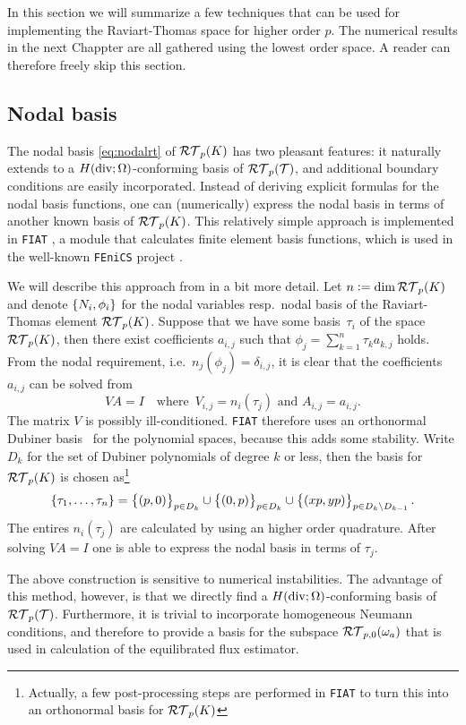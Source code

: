 \documentclass[thesis.tex]{subfiles}
\begin{document}
  In this section we will summarize a few techniques that can be used for implementing the Raviart-Thomas space for higher order $p$.
  The numerical results in the next Chappter are all gathered using the lowest order space. A reader can therefore freely skip this section.

  \subsection{Nodal basis}
  The nodal basis \eqref{eq:nodalrt} of $\mathcal{RT}_p(K)$ has two pleasant features: it
  naturally extends to a $H(\operatorname{div}; \Omega)$-conforming basis of $\mathcal{RT}_p(\mathcal{T})$, and additional boundary conditions are easily incorporated.
  Instead of deriving explicit formulas for the nodal basis functions, one can (numerically) express the nodal basis in terms
  of another known basis of $\mathcal{RT}_p(K)$. This relatively simple approach is implemented in \texttt{FIAT} \cite{kirby}, a module that 
  calculates finite element basis functions,  
  which is used in the well-known \texttt{FEniCS} project \cite{fenics}. 

  We will describe this approach from \cite{kirby} in a bit more detail. Let $n := \dim \mathcal{RT}_p(K)$ and denote $\set{N_i, \phi_i}$ for the nodal variables 
  resp.~nodal basis of the Raviart-Thomas element $\mathcal{RT}_p(K)$.
  Suppose that we have some basis~$\tau_i$ of the space~$\mathcal{RT}_p(K)$, then there exist coefficients $a_{i,j}$ such that
  $\phi_j = \sum_{k = 1}^n \tau_k a_{k,j}$ holds.
  From the nodal requirement, i.e.~$n_j(\phi_j) = \delta_{i,j}$, it is clear that the coefficients $a_{i,j}$ can be solved from
  \[
    VA = I \quad \text{where }\, V_{i,j} = n_i(\tau_j) \text{ and } A_{i,j} = a_{i,j}.
  \]
  The matrix $V$ is possibly ill-conditioned. \texttt{FIAT} therefore uses an orthonormal Dubiner basis~\cite{dubiner1991spectral} for the polynomial spaces,
  because this adds some stability. Write $D_k$ for the set of Dubiner polynomials of degree $k$ or less,
  then the basis for $\mathcal{RT}_p(K)$ is chosen as\footnote{Actually, a few post-processing steps are performed in \texttt{FIAT} to turn this into an orthonormal basis for $\mathcal{RT}_p(K)$}
  \[
    \set{\tau_1,\dots, \tau_n} = \set{(p,0)}_{p \in D_k} \cup \set{(0,p)}_{p \in D_k} \cup \set{(xp, yp)}_{p \in D_k \setminus D_{k-1}}.
  \]
  The entires $n_i(\tau_j)$ are calculated by using an higher order quadrature. After solving $VA = I$ one is 
  able to express the nodal basis in terms of $\tau_j$.

  The above construction is sensitive to numerical instabilities. The advantage of this method, however, is that
  we directly find a $H(\operatorname{div}; \Omega)$-conforming basis of $\mathcal{RT}_p(\mathcal{T})$. Furthermore, it is trivial to incorporate homogeneous Neumann conditions,
  and therefore to provide a basis for the subspace $\mathcal{RT}_{p,0}(\omega_a)$ that
  is used in calculation of the equilibrated flux estimator.
\end{document}
